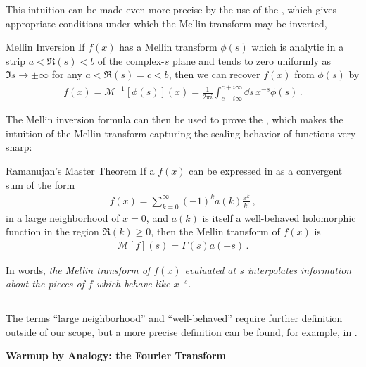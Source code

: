 \begin{subappendices}
This intuition can be made even more precise by the use of the , which gives appropriate conditions under which the Mellin transform may be inverted,
\begin{proposition}{Mellin Inversion}{}
    If \(f(x)\) has a Mellin transform \(\phi(s)\) which is analytic in a strip \(a < \Re(s) < b\) of the complex-\(s\) plane and tends to zero uniformly as \(\Im s \to \pm \infty\) for any \(a < \Re(s) = c < b\), then we can recover \(f(x)\) from \(\phi(s)\) by
    \begin{align}
        f(x) = \mathcal{M}^{-1}[\phi(s)](x)
        =
        \frac{1}{2\pi i}
        \int_{c-i\infty}^{c+i \infty}
        \dd s
        \,
        x^{-s} \phi(s)
        \,.
    \end{align}
\end{proposition}
%
The Mellin inversion formula can then be used to prove the , which makes the intuition of the Mellin transform capturing the scaling behavior of functions very sharp:
\begin{proposition}{Ramanujan's Master Theorem}{}
    If a \(f(x)\) can be expressed in as a convergent sum of the form
    \begin{align}
        f(x) = \sum_{k = 0}^\infty (-1)^k a(k) \frac{x^k}{k!}
        \,,
    \end{align}
    in a large neighborhood of \(x = 0\), and \(a(k)\) is itself a well-behaved holomorphic function in the region \(\Re(k) \geq 0\), then the Mellin transform of \(f(x)\) is
    \begin{align}
        \mathcal{M}[f](s)
        =
        \Gamma(s) a(-s)
        \,.
    \end{align}

    In words, \textit{the Mellin transform of \(f(x)\) evaluated at \(s\) interpolates information about the pieces of \(f\) which behave like \(x^{-s}\)}.

    \vspace{7pt}
    \hrule
    \vspace{7pt}

    The terms ``large neighborhood'' and ``well-behaved'' require further definition outside of our scope, but a more precise definition can be found, for example, in .
\end{proposition}





\begin{exercise}
    \textbf{Warmup by Analogy: the Fourier Transform}


\end{exercise}
\end{subappendices}
